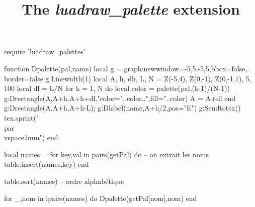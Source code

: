 \documentclass[10pt,a4paper,twocolumn]{article}%
\title{The \emph{luadraw\_palette} extension}
\date{}
\begin{document}
\maketitle{}


\begin{luacode*}
require 'luadraw_palettes'

function Dpalette(pal,name)
    local g = graph:new{window={-5,5,-5,5},bbox=false, border=false}
    g:Linewidth(1)
    local A, h, dh, L, N = Z(-5,4), Z(0,-1), Z(0,-1.1), 5, 100
    local dl = L/N
    for k = 1, N do
        local color = palette(pal,(k-1)/(N-1))
        g:Drectangle(A,A+h,A+h+dl,"color="..color..",fill="..color)
        A = A+dl
    end
    g:Drectangle(A,A+h,A+h-L); g:Dlabel(name,A+h/2,{pos="E"})
    g:Sendtotex()
    tex.sprint("\\par\\vspace{1mm}")
end

local names = {}
for key,val in pairs(getPal) do -- on extrait les noms
    table.insert(names,key)
end

table.sort(names) -- ordre alphabétique

for _,nom in ipairs(names) do
    Dpalette(getPal[nom],nom)
end
\end{luacode*}
\end{document}
